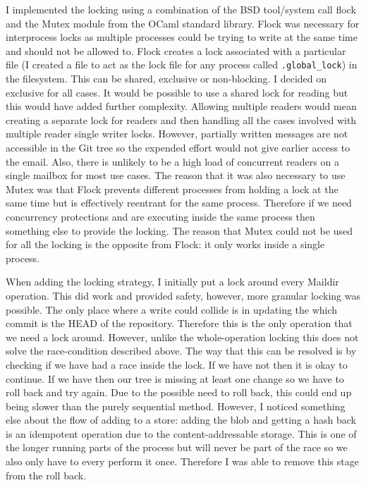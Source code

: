 I implemented the locking using a combination of the BSD tool/system call flock\cite{manual_flock} and the Mutex module from the OCaml standard library. Flock was necessary for interprocess locks as multiple processes could be trying to write at the same time and should not be allowed to. Flock creates a lock associated with a particular file (I created a file to act as the lock file for any process called \texttt{.global\_lock}) in the filesystem. This can be shared, exclusive or non-blocking. I decided on exclusive for all cases. It would be possible to use a shared lock for reading but this would have added further complexity. Allowing multiple readers would mean creating a separate lock for readers and then handling all the cases involved with multiple reader single writer locks. However, partially written messages are not accessible in the Git tree so the expended effort would not give earlier access to the email. Also, there is unlikely to be a high load of concurrent readers on a single mailbox for most use cases. The reason that it was also necessary to use Mutex was that Flock prevents different processes from holding a lock at the same time but is effectively reentrant for the same process. Therefore if we need concurrency protections and are executing inside the same process then something else to provide the locking. The reason that Mutex could not be used for all the locking is the opposite from Flock: it only works inside a single process.

When adding the locking strategy, I initially put a lock around every Maildir operation. This did work and provided safety, however, more granular locking was possible. The only place where a write could collide is in updating the which commit is the HEAD of the repository. Therefore this is the only operation that we need a lock around. However, unlike the whole-operation locking this does not solve the race-condition described above. The way that this can be resolved is by checking if we have had a race inside the lock. If we have not then it is okay to continue. If we have then our tree is missing at least one change so we have to roll back and try again. Due to the possible need to roll back, this could end up being slower than the purely sequential method. However, I noticed something else about the flow of adding to a store: adding the blob and getting a hash back is an idempotent operation due to the content-addressable storage. This is one of the longer running parts of the process but will never be part of the race so we also only have to every perform it once. Therefore I was able to remove this stage from the roll back.

